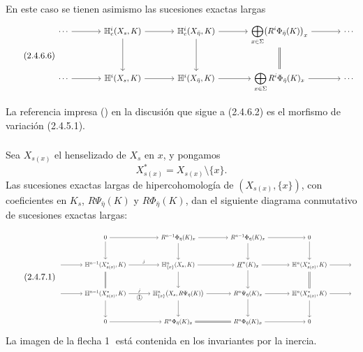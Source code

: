 En este caso se tienen asimismo las sucesiones exactas largas
\begin{equation}\tag{2.4.6.6}
\resizebox{\textwidth}{!}{%
\begin{tikzcd}[ampersand replacement=\&, column sep=large, row sep=large]
\cdots \arrow[r]
  \& \mathbb H^i_c(X_s,K) \arrow[r] \arrow[d]
  \& \mathbb H^i_c(X_{\bar\eta},K) \arrow[r] \arrow[d]
  \& \displaystyle\bigoplus_{x\in\Sigma}
     \bigl(R^i\Phi_{\bar\eta}(K)\bigr)_x
     \arrow[r] \arrow[d, equal]
  \& \cdots \\
\cdots \arrow[r]
  \& \mathbb H^i(X_s,K) \arrow[r]
  \& \mathbb H^i(X_{\bar\eta},K) \arrow[r]
  \& \displaystyle\bigoplus_{x\in\Sigma}
     R^i\Phi_{\bar\eta}(K)_x \arrow[r]
  \& \cdots
\end{tikzcd}}
\end{equation}

La referencia impresa () en la discusión que sigue a
(2.4.6.2) es el morfismo de variación (2.4.5.1).

\subsubsection*{}
Sea $X_{s(x)}$ el henselizado de $X_s$ en $x$, y pongamos
\[
X^*_{s(x)}=X_{s(x)}\setminus\{x\}.
\]
Las sucesiones exactas largas de hipercohomología de
$(X_{s(x)},\{x\})$, con coeficientes en $K_s$,
$R\Psi_{\bar\eta}(K)$ y $R\Phi_{\bar\eta}(K)$, dan el siguiente diagrama
conmutativo de sucesiones exactas largas:

\pageoriginale

\begin{equation}\tag{\sisi{2.4.6.1}{2.4.7.1}}
\resizebox{\textwidth}{!}{%
\begin{tikzcd}[ampersand replacement=\&, column sep=large, row sep=large]
{}
  \& 0 \arrow[r] \arrow[d]
  \& R^{n-1}\Phi_{\bar\eta}(K)_x \arrow[r] \arrow[d]
  \& R^{n-1}\Phi_{\bar\eta}(K)_x \arrow[r] \arrow[d]
  \& 0 \arrow[d]
  \& {} \\
{} \arrow[r]
  \& \mathbb H^{n-1}(X^*_{s(x)},K)
     \arrow[r, "j"] \arrow[d, equal]
  \& \mathbb H^n_{\{x\}}(X_s,K) \arrow[r] \arrow[d]
  \& \underline{H}^{n}(K)_x \arrow[r] \arrow[d]
  \& \mathbb H^n(X^*_{s(x)},K)
     \arrow[r] \arrow[d, equal]
  \& {} \\
{} \arrow[r]
  \& \mathbb H^{n-1}(X^*_{s(x)},K)
     \arrow[r, "j", "{\mbox{\textcircled{1}}}"'] \arrow[d]
  \& \mathbb H^n_{\{x\}}\bigl(X_s,R\Psi_{\bar\eta}(K)\bigr)
     \arrow[r] \arrow[d]
  \& R^n\Psi_{\bar\eta}(K)_x \arrow[r] \arrow[d]
  \& \mathbb H^n(\sisi{X_{s(x)}}{X^*_{s(x)}},K) \arrow[r] \arrow[d]
  \& {} \\
{}
  \& 0 \arrow[r]
  \& R^n\Phi_{\bar\eta}(K)_x \arrow[r, equal]
  \& R^n\Phi_{\bar\eta}(K)_x \arrow[r]
  \& 0
  \& {}
\end{tikzcd}}
\end{equation}
La imagen de la flecha \textcircled{1} está contenida en los invariantes por
la inercia.

